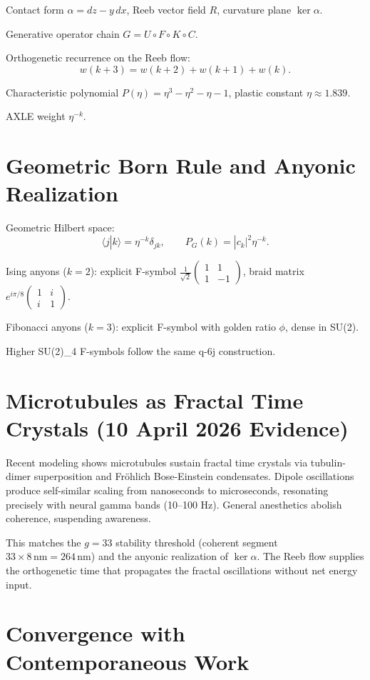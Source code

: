 \documentclass[11pt,a4paper]{article}
\begin{document}
Contact form \(\alpha=dz-y\,dx\), Reeb vector field \(R\), curvature plane \(\ker\alpha\).

Generative operator chain \(G=U\circ F\circ K\circ C\).

Orthogenetic recurrence on the Reeb flow:
\[
w(k+3)=w(k+2)+w(k+1)+w(k).
\]

Characteristic polynomial \(P(\eta)=\eta^3-\eta^2-\eta-1\), plastic constant \(\eta\approx1.839\).

AXLE weight \(\eta^{-k}\).

\section{Geometric Born Rule and Anyonic Realization}

Geometric Hilbert space:
\[
\langle j|k\rangle=\eta^{-k}\delta_{jk},\qquad P_G(k)=|c_k|^2\eta^{-k}.
\]

Ising anyons (\(k=2\)): explicit F-symbol \(\frac{1}{\sqrt{2}}\begin{pmatrix}1&1\\1&-1\end{pmatrix}\), braid matrix \(e^{i\pi/8}\begin{pmatrix}1&i\\i&1\end{pmatrix}\).

Fibonacci anyons (\(k=3\)): explicit F-symbol with golden ratio \(\phi\), dense in SU(2).

Higher SU(2)_4 F-symbols follow the same q-6j construction.

\section{Microtubules as Fractal Time Crystals (10 April 2026 Evidence)}

Recent modeling shows microtubules sustain fractal time crystals via tubulin-dimer superposition and Fröhlich Bose-Einstein condensates. Dipole oscillations produce self-similar scaling from nanoseconds to microseconds, resonating precisely with neural gamma bands (10–100 Hz). General anesthetics abolish coherence, suspending awareness.

This matches the \(g=33\) stability threshold (coherent segment \(33\times8\,\text{nm}=264\,\text{nm}\)) and the anyonic realization of \(\ker\alpha\). The Reeb flow supplies the orthogenetic time that propagates the fractal oscillations without net energy input.

\section{Convergence with Contemporaneous Work}
\end{document}
